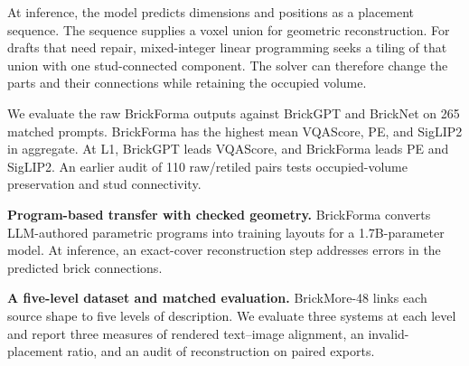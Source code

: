 At inference, the model predicts dimensions and positions as a placement sequence. The sequence supplies a voxel union for geometric reconstruction. For drafts that need repair, mixed-integer linear programming seeks a tiling of that union with one stud-connected component. The solver can therefore change the parts and their connections while retaining the occupied volume.

We evaluate the raw BrickForma outputs against BrickGPT and BrickNet on 265 matched prompts. BrickForma has the highest mean VQAScore, PE, and SigLIP2 in aggregate. At L1, BrickGPT leads VQAScore, and BrickForma leads PE and SigLIP2. An earlier audit of 110 raw/retiled pairs tests occupied-volume preservation and stud connectivity.

\noindent\textbf{Program-based transfer with checked geometry.}
BrickForma converts LLM-authored parametric programs into training layouts for a 1.7B-parameter model. At inference, an exact-cover reconstruction step addresses errors in the predicted brick connections.

\noindent\textbf{A five-level dataset and matched evaluation.}
BrickMore-48 links each source shape to five levels of description. We evaluate three systems at each level and report three measures of rendered text--image alignment, an invalid-placement ratio, and an audit of reconstruction on paired exports.

